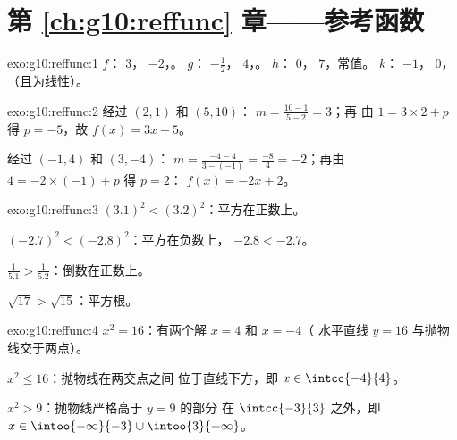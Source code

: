 \section*{第 \ref{ch:g10:reffunc} 章——参考函数}

\begin{solution}{exo:g10:reffunc:1}
$f$： $3$， $-2$，。\quad
$g$： $-\frac12$， $4$，。\quad
$h$： $0$， $7$，常值。\quad
$k$： $-1$， $0$，（且为线性）。
\end{solution}

\begin{solution}{exo:g10:reffunc:2}
经过 $(2,1)$ 和 $(5,10)$： $m = \frac{10 - 1}{5 - 2} = 3$；再
由 $1 = 3 \times 2 + p$ 得 $p = -5$，故 $f(x) = 3x - 5$。

经过 $(-1,4)$ 和 $(3,-4)$： $m = \frac{-4 - 4}{3 - (-1)} =
\frac{-8}{4} = -2$；再由 $4 = -2 \times (-1) + p$ 得 $p = 2$：
$f(x) = -2x + 2$。
\end{solution}

\begin{solution}{exo:g10:reffunc:3}
$(3.1)^2 < (3.2)^2$：平方在正数上。

$(-2.7)^2 < (-2.8)^2$：平方在负数上，
$-2.8 < -2.7$。

$\frac{1}{5.1} > \frac{1}{5.2}$：倒数在正数上。

$\sqrt{17} > \sqrt{15}$：平方根。
\end{solution}

\begin{solution}{exo:g10:reffunc:4}
$x^2 = 16$：有两个解 $x = 4$ 和 $x = -4$（
水平直线 $y = 16$ 与抛物线交于两点）。

$x^2 \leq 16$：抛物线在两交点之间
位于直线下方，即 $x \in \intcc{-4}{4}$。

$x^2 > 9$：抛物线严格高于 $y = 9$ 的部分
在 $\intcc{-3}{3}$ 之外，即 $x \in \intoo{-\infty}{-3} \cup \intoo{3}{+\infty}$。
\end{solution}

